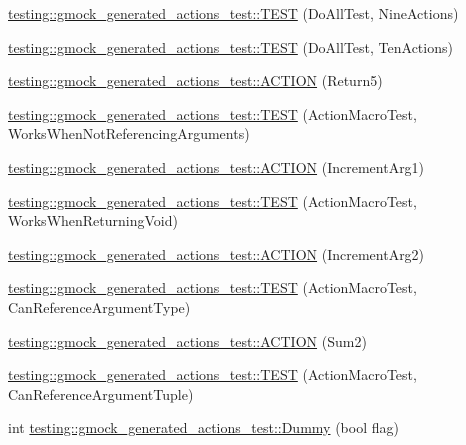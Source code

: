 \begin{DoxyCompactItemize}
\item 
\hyperlink{namespacetesting_1_1gmock__generated__actions__test_ae2037cf34f7bbdb2aa779f31f44c0530}{testing\+::gmock\+\_\+generated\+\_\+actions\+\_\+test\+::\+T\+E\+ST} (Do\+All\+Test, Nine\+Actions)
\item 
\hyperlink{namespacetesting_1_1gmock__generated__actions__test_a11cc35bfa98278915c040aac2329b4a7}{testing\+::gmock\+\_\+generated\+\_\+actions\+\_\+test\+::\+T\+E\+ST} (Do\+All\+Test, Ten\+Actions)
\item 
\hyperlink{namespacetesting_1_1gmock__generated__actions__test_a1275b0757e9f1caf70fbc23da141acd3}{testing\+::gmock\+\_\+generated\+\_\+actions\+\_\+test\+::\+A\+C\+T\+I\+ON} (Return5)
\item 
\hyperlink{namespacetesting_1_1gmock__generated__actions__test_a6a73da775945f4294d9377b0110bb237}{testing\+::gmock\+\_\+generated\+\_\+actions\+\_\+test\+::\+T\+E\+ST} (Action\+Macro\+Test, Works\+When\+Not\+Referencing\+Arguments)
\item 
\hyperlink{namespacetesting_1_1gmock__generated__actions__test_a960f5a5ca2b6a95ce1f3f1673b90d02d}{testing\+::gmock\+\_\+generated\+\_\+actions\+\_\+test\+::\+A\+C\+T\+I\+ON} (Increment\+Arg1)
\item 
\hyperlink{namespacetesting_1_1gmock__generated__actions__test_accde1673541c5076b0e09b3f1914c9d2}{testing\+::gmock\+\_\+generated\+\_\+actions\+\_\+test\+::\+T\+E\+ST} (Action\+Macro\+Test, Works\+When\+Returning\+Void)
\item 
\hyperlink{namespacetesting_1_1gmock__generated__actions__test_aa2c56f5c6a770b252ebdc27a6d8b613d}{testing\+::gmock\+\_\+generated\+\_\+actions\+\_\+test\+::\+A\+C\+T\+I\+ON} (Increment\+Arg2)
\item 
\hyperlink{namespacetesting_1_1gmock__generated__actions__test_abdfd8146dfbb5a152326a851b13e45cb}{testing\+::gmock\+\_\+generated\+\_\+actions\+\_\+test\+::\+T\+E\+ST} (Action\+Macro\+Test, Can\+Reference\+Argument\+Type)
\item 
\hyperlink{namespacetesting_1_1gmock__generated__actions__test_a108b4ee75c3b13445b7035fd5ecd6d6d}{testing\+::gmock\+\_\+generated\+\_\+actions\+\_\+test\+::\+A\+C\+T\+I\+ON} (Sum2)
\item 
\hyperlink{namespacetesting_1_1gmock__generated__actions__test_a4e2d8b9ac63b2f6dc6d4b17c3a767dee}{testing\+::gmock\+\_\+generated\+\_\+actions\+\_\+test\+::\+T\+E\+ST} (Action\+Macro\+Test, Can\+Reference\+Argument\+Tuple)
\item 
int \hyperlink{namespacetesting_1_1gmock__generated__actions__test_ab91824b86c842e024337b6de45eb8cdc}{testing\+::gmock\+\_\+generated\+\_\+actions\+\_\+test\+::\+Dummy} (bool flag)

\end{DoxyCompactItemize}
